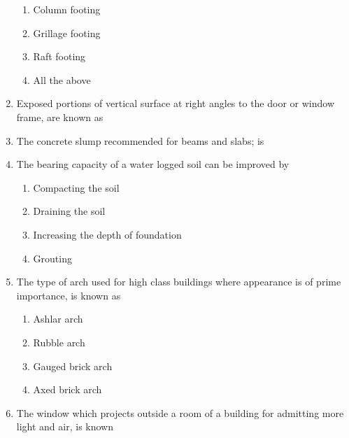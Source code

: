 \documentclass[11pt,a4paper]{article}
\begin{document}
\begin{enumerate}
\begin{enumerate}[label=\Alph*.]
\item{Column footing}
\item{Grillage footing}
\item{Raft footing}
\item{All the above}
\end{enumerate}
\item{Exposed portions of vertical surface at right angles to the door or window frame, are known as}
\\
\item{The concrete slump recommended for beams and slabs; is}
\\
\item{The bearing capacity of a water logged soil can be improved by}
\begin{enumerate}[label=\Alph*.]
\item{Compacting the soil}
\item{Draining the soil}
\item{Increasing the depth of foundation}
\item{Grouting}
\end{enumerate}
\item{The type of arch used for high class buildings where appearance is of prime importance, is known as}
\begin{enumerate}[label=\Alph*.]
\item{Ashlar arch}
\item{Rubble arch}
\item{Gauged brick arch}
\item{Axed brick arch}
\end{enumerate}
\item{The window which projects outside a room of a building for admitting more light and air, is known}

\end{enumerate}
\end{document}
